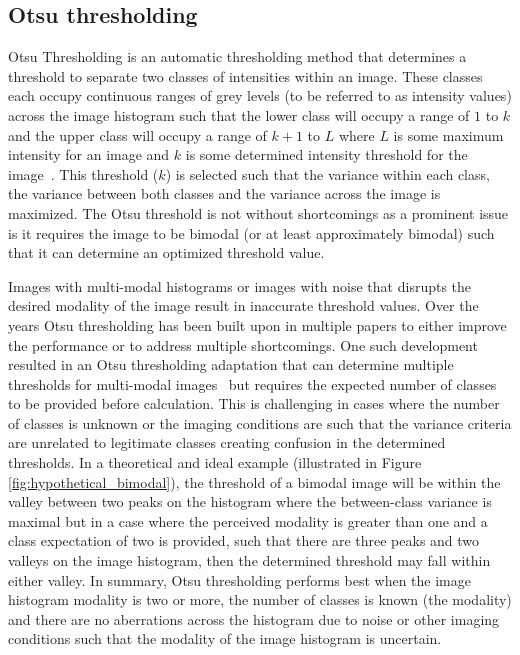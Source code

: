 \subsection{Otsu thresholding}
Otsu Thresholding is an automatic thresholding method that determines a threshold to separate two classes of intensities within an image. These classes each occupy continuous ranges of grey levels (to be referred to as intensity values) across the image histogram such that the lower class will occupy a range of $1$ to $k$ and the upper class will occupy a range of $k+1$ to $L$ where $L$ is some maximum intensity for an image and $k$ is some determined intensity threshold for the image~\cite{Otsu1979ATS}. This threshold ($k$) is selected such that the variance within each class, the variance between both classes and the variance across the image is maximized. The Otsu threshold is not without shortcomings as a prominent issue is it requires the image to be bimodal (or at least approximately bimodal) such that it can determine an optimized threshold value.\par Images with multi-modal histograms or images with noise that disrupts the desired modality of the image result in inaccurate threshold values. Over the years Otsu thresholding has been built upon in multiple papers to either improve the performance or to address multiple shortcomings. One such development resulted in an Otsu thresholding adaptation that can determine multiple thresholds for multi-modal images~\cite{MultiOtsu} but requires the expected number of classes to be provided before calculation. This is challenging in cases where the number of classes is unknown or the imaging conditions are such that the variance criteria are unrelated to legitimate classes creating confusion in the determined thresholds. In a theoretical and ideal example (illustrated in Figure \ref{fig:hypothetical_bimodal}), the threshold of a bimodal image will be within the valley between two peaks on the histogram where the between-class variance is maximal but in a case where the perceived modality is greater than one and a class expectation of two is provided, such that there are three peaks and two valleys on the image histogram, then the determined threshold may fall within either valley. In summary, Otsu thresholding performs best when the image histogram modality is two or more, the number of classes is known (the modality) and there are no aberrations across the histogram due to noise or other imaging conditions such that the modality of the image histogram is uncertain.

